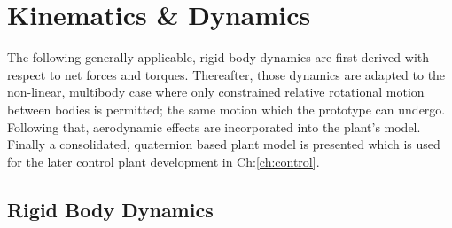 \chapter{Kinematics \& Dynamics}
\label{ch:dynamics}
The following generally applicable, rigid body dynamics are first derived with respect to net forces and torques. Thereafter, those dynamics are adapted to the non-linear, multibody case where only constrained relative rotational motion between bodies is permitted; the same motion which the prototype can undergo. Following that, aerodynamic effects are incorporated into the plant's model. Finally a consolidated, quaternion based plant model is presented which is used for the later control plant development in Ch:\ref{ch:control}.
\section{Rigid Body Dynamics}
\label{sec:dynamics.rigidbody}
